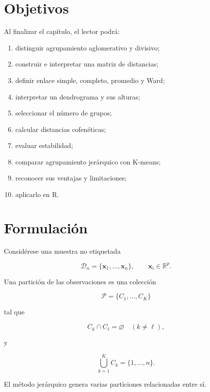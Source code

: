 \documentclass[
  spanish,
  10.5pt,
  letterpaper,
  DIV=11,
  numbers=noendperiod,
  oneside,
  open=any]{scrreprt}
\providecommand{\tightlist}{%
  \setlength{\itemsep}{0pt}\setlength{\parskip}{0pt}}
\theoremstyle{definition}
\theoremstyle{definition}
\theoremstyle{plain}
\theoremstyle{remark}
\begin{document}
\section*{Objetivos}\label{objetivos-18}


Al finalizar el capítulo, el lector podrá:

\begin{enumerate}
\def\labelenumi{\arabic{enumi}.}
\tightlist
\item
  distinguir agrupamiento aglomerativo y divisivo;
\item
  construir e interpretar una matriz de distancias;
\item
  definir enlace simple, completo, promedio y
  Ward;
\item
  interpretar un dendrograma y sus alturas;
\item
  seleccionar el número de grupos;
\item
  calcular distancias cofenéticas;
\item
  evaluar estabilidad;
\item
  comparar agrupamiento jerárquico con K-means;
\item
  reconocer sus ventajas y limitaciones;
\item
  aplicarlo en R.
\end{enumerate}

\section*{Formulación}\label{formulaciuxf3n}


Considérese una muestra no etiquetada

\[
\mathcal{D}_n=\{\mathbf{x}_1,\ldots,\mathbf{x}_n\},
\qquad
\mathbf{x}_i\in\mathbb{R}^p.
\]

Una partición de las observaciones es una colección

\[
\mathcal{P}=\{C_1,\ldots,C_K\}
\]

tal que

\[
C_k\cap C_\ell=\varnothing
\quad (k\neq \ell),
\]

y

\[
\bigcup_{k=1}^{K}C_k=\{1,\ldots,n\}.
\]

El método jerárquico genera varias particiones relacionadas entre sí.
\end{document}

